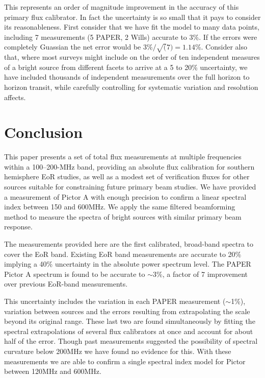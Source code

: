 \documentclass[preprint]{aastex}
\begin{document}
This represents an order of magnitude improvement in the accuracy of this primary 
flux calibrator. In fact the uncertainty is so small that it pays to consider its reasonableness.
First consider that we have fit the model to many data points, including  7 measurements
(5 PAPER, 2 Wills) accurate to 3\%. If the errors were completely Guassian
the net error would be $3\%/\sqrt(7) = 1.14$\%. Consider also that, where most surveys
might include on the order of ten independent measures of a bright source from different facets to arrive at 
a 5 to 20\% uncertainty,  we have included thousands of independent measurements
over the full horizon to horizon transit, while carefully controlling for systematic variation and resolution affects.



 \section{Conclusion}
 \label{sec:Conclusion}

This paper presents a set of total flux measurements at multiple frequencies within
a 100--200-MHz band, providing
an absolute flux calibration for southern hemisphere EoR studies, as well as a
modest set of verification fluxes for other sources suitable for constraining future primary beam studies.
We have provided a measurement of Pictor A with enough precision to confirm
a linear spectral index between 150 and 600MHz. We apply the same
filtered beamforming method to measure the spectra of bright sources with similar
primary beam response.

The measurements provided
here are the first calibrated, broad-band spectra to cover the EoR band. Existing EoR band measurements
are accurate to 20\% implying a 40\% uncertainty in the absolute power spectrum
level.  The PAPER Pictor A spectrum is found to be accurate to 
$\sim$3\%, a factor of 7 improvement over previous EoR-band measurements.

This uncertainty includes the 
variation in each PAPER measurement ($\sim$1\%), variation between sources and the errors resulting
from extrapolating the \citet{Baars:1977p9678} scale beyond its original range. These last
two are found simultaneously by fitting the spectral extrapolations of several flux calibrators
at once and account for about half of the error. Though past measurements suggested the possibility
of spectral curvature below 200MHz we have found no evidence for this.  With these measurements we are able 
to confirm a single spectral index model for Pictor between 120MHz and 600MHz.
\end{document}
